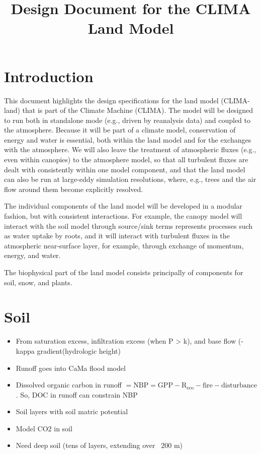 \documentclass{article}
\title{Design Document for the CLIMA Land Model}
\author{ }
\begin{document}
\maketitle
\tableofcontents

\section{Introduction}\label{s:introduction}

This document highlights the design specifications for the land model (CLIMA-land) that is part of the Climate Machine (CLIMA). The model will be designed to run both in standalone mode (e.g., driven by reanalysis data) and coupled to the atmosphere. Because it will be part of a climate model, conservation of energy and water is essential, both within the land model and for the exchanges with the atmosphere. We will also leave the treatment of atmospheric fluxes (e.g., even within canopies) to the atmosphere model, so that all turbulent fluxes are dealt with consistently within one model component, and that the land model can also be run at large-eddy simulation resolutions, where, e.g., trees and the air flow around them become explicitly resolved. 

The individual components of the land model will be developed in a modular fashion, but with consistent interactions. For example, the canopy model will interact with the soil model through source/sink terms represents processes such as water uptake by roots, and it will interact with turbulent fluxes in the atmospheric near-surface layer, for example, through exchange of momentum, energy, and water. 

The biophysical part of the land model consists principally of components for soil, snow, and plants.

\section{Soil}

\begin{itemize}
\item From saturation excess, infiltration excess (when P > k), and base flow (-kappa gradient(hydrologic height)
\item Runoff goes into CaMa flood model
\item Dissolved organic carbon in runoff $\mathrm{= NBP = GPP - R_{eco} - fire - disturbance}$. So, DOC in runoff can constrain NBP
\item Soil layers with soil matric potential
\item Model CO2 in soil
\item Need deep soil (tens of layers, extending over ~200 m)
\end{itemize}
\end{document}
